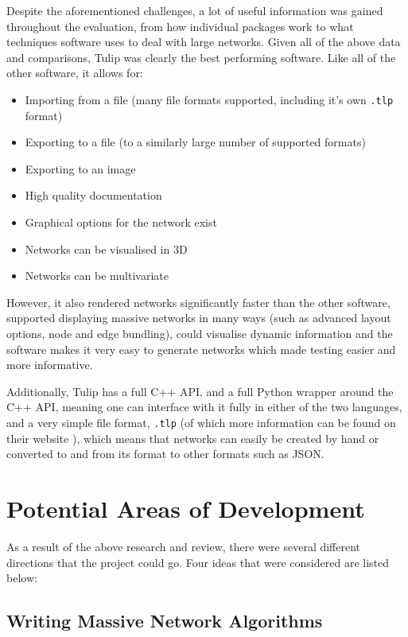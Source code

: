 \documentclass[../dissertation.tex]{subfiles}
\begin{document}
Despite the aforementioned challenges, a lot of useful information was gained throughout the evaluation, from how individual packages work to what techniques software uses to deal with large networks. Given all of the above data and comparisons, Tulip was clearly the best performing software. Like all of the other software, it allows for:
\begin{itemize}
    \item Importing from a file (many file formats supported, including it's own \texttt{.tlp} format)
    \item Exporting to a file (to a similarly large number of supported formats)
    \item Exporting to an image
    \item High quality documentation
    \item Graphical options for the network exist
    \item Networks can be visualised in 3D
    \item Networks can be multivariate
\end{itemize}

However, it also rendered networks significantly faster than the other software, supported displaying massive networks in many ways (such as advanced layout options, node and edge bundling), could visualise dynamic information and the software makes it very easy to generate networks which made testing easier and more informative. 

Additionally, Tulip has a full C++ API, and a full Python wrapper around the C++ API, meaning one can interface with it fully in either of the two languages, and a very simple file format, \texttt{.tlp} (of which more information can be found on their website \cite{tuliptlp}), which means that networks can easily be created by hand or converted to and from its format to other formats such as JSON.

\section{Potential Areas of Development}

As a result of the above research and review, there were several different directions that the project could go. Four ideas that were considered are listed below:

\subsection{Writing Massive Network Algorithms}
\end{document}
